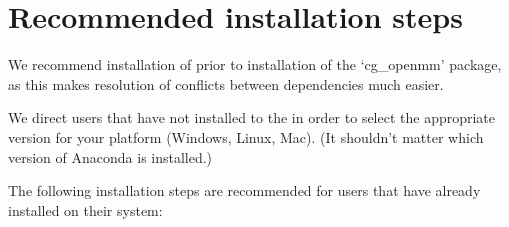 \documentclass[letterpaper,12pt,english,openany,oneside]{sphinxmanual}
\begin{document}
\section{Recommended installation steps}
\label{\detokenize{install:recommended-installation-steps}}
We recommend installation of  prior to installation of the ‘cg\_openmm’ package, as this makes resolution of conflicts between dependencies much easier.

We direct users that have not installed  to the  in order to select the appropriate version for your platform (Windows, Linux, Mac).  (It shouldn’t matter which version of Anaconda is installed.)

The following installation steps are recommended for users that have already installed  on their system:
\end{document}
